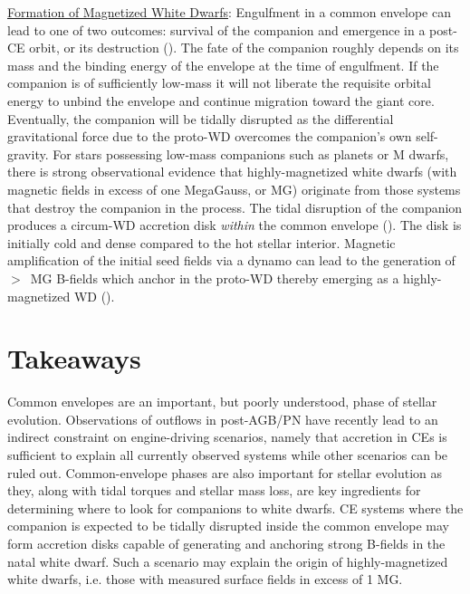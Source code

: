 \documentclass{iau_FM}
\begin{document}
{\sc\underline{Formation of Magnetized White Dwarfs}}: Engulfment in a common envelope can lead to one of two outcomes: survival of the companion and emergence in a post-CE orbit, or its destruction (\cite{2006MNRAS.370.2004N}).  The fate of the companion roughly depends on its mass and the binding energy of the envelope at the time of engulfment.  If the companion is of sufficiently low-mass it will not liberate the requisite orbital energy to unbind the envelope and continue migration toward the giant core.  Eventually, the companion will be tidally disrupted as the differential gravitational force due to the proto-WD overcomes the companion's own self-gravity.  For stars possessing low-mass companions such as planets or M dwarfs, there is strong observational evidence that highly-magnetized white dwarfs (with magnetic fields in excess of one MegaGauss, or MG) originate from those systems that destroy the companion in the process.  The tidal disruption of the companion produces a circum-WD accretion disk {\it within} the common envelope (\cite{2011PNAS..108.3135N}).  The disk is initially cold and dense compared to the hot stellar interior.  Magnetic amplification of the initial seed fields via a dynamo can lead to the generation of $>$~MG B-fields which anchor in the proto-WD thereby emerging as a highly-magnetized WD (\cite{2011PNAS..108.3135N}).

\section{Takeaways}
Common envelopes are an important, but poorly understood, phase of stellar evolution.  Observations of outflows in post-AGB/PN have recently lead to an indirect constraint on engine-driving scenarios, namely that accretion in CEs is sufficient to explain all currently observed systems while other scenarios can be ruled out.  Common-envelope phases are also important for stellar evolution as they, along with tidal torques and stellar mass loss, are key ingredients for determining where to look for companions to white dwarfs.  CE systems where the companion is expected to be tidally disrupted inside the common envelope may form accretion disks capable of generating and anchoring strong B-fields in the natal white dwarf.  Such a scenario may explain the origin of highly-magnetized white dwarfs, i.e. those with measured surface fields in excess of 1 MG.  
\end{document}
